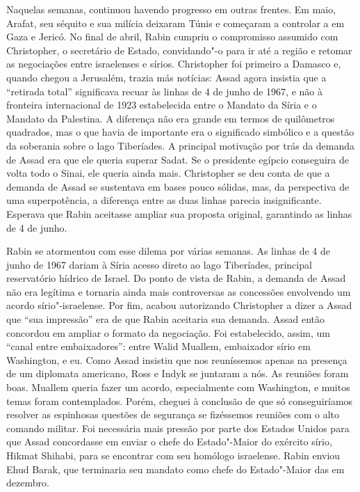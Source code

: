 Naquelas semanas, continuou havendo progresso em outras frentes. Em
maio, Arafat, seu séquito e sua milícia deixaram Túnis e começaram a
controlar a  em Gaza e Jericó. No final de abril, Rabin cumpriu o
compromisso assumido com Christopher, o secretário de Estado,
convidando"-o para ir até a região e retomar as negociações entre
israelenses e sírios. Christopher foi primeiro a Damasco e, quando chegou
a Jerusalém, trazia más notícias: Assad agora insistia que a ``retirada
total'' significava recuar às linhas de 4 de junho de 1967, e não à
fronteira internacional de 1923 estabelecida entre o Mandato da Síria e
o Mandato da Palestina. A diferença não era grande em termos de
quilômetros quadrados, mas o que havia de importante era o significado
simbólico e a questão da soberania sobre o lago Tiberíades. A principal
motivação por trás da demanda de Assad era que ele queria superar Sadat.
Se o presidente egípcio conseguira de volta todo o Sinai, ele queria
ainda mais. Christopher se deu conta de que a demanda de Assad se
sustentava em bases pouco sólidas, mas, da perspectiva de uma
superpotência, a diferença entre as duas linhas parecia insignificante.
Esperava que Rabin aceitasse ampliar sua proposta original, garantindo
as linhas de 4 de junho.

Rabin se atormentou com esse dilema por várias semanas. As linhas de 4
de junho de 1967 dariam à Síria acesso direto ao lago Tiberíades,
principal reservatório hídrico de Israel. Do ponto de vista de Rabin, a
demanda de Assad não era legítima e tornaria ainda mais controversas as
concessões envolvendo um acordo sírio"-israelense. Por fim, acabou
autorizando Christopher a dizer a Assad que ``sua impressão'' era de que
Rabin aceitaria sua demanda. Assad então concordou em ampliar o formato
da negociação. Foi estabelecido, assim, um ``canal entre embaixadores'':
entre Walid Muallem, embaixador sírio em Washington, e eu. Como Assad
insistiu que nos reuníssemos apenas na presença de um diplomata
americano, Ross e Indyk se juntaram a nós. As reuniões foram boas.
Muallem queria fazer um acordo, especialmente com Washington, e muitos
temas foram contemplados. Porém, cheguei à conclusão de que só
conseguiríamos resolver as espinhosas questões de segurança se
fizéssemos reuniões com o alto comando militar. Foi necessária mais
pressão por parte dos Estados Unidos para que Assad concordasse em enviar
o chefe do Estado"-Maior do exército sírio, Hikmat Shihabi, para se
encontrar com seu homólogo israelense. Rabin enviou Ehud Barak, que
terminaria seu mandato como chefe do Estado"-Maior das  em dezembro.


